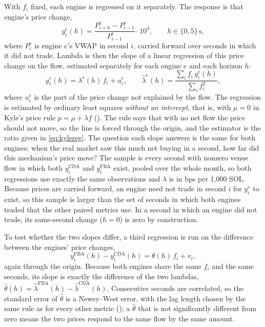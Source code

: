 With $f_i$ fixed, each engine is regressed on it separately. The response
is that engine's price change,
\begin{equation}
  \label{eq:kyley}
  y^{e}_i(h) = \frac{P^{e}_{i+h} - P^{e}_{i-1}}{P^{e}_{i-1}} \cdot 10^{4},
  \qquad h \in \{0, 5\}\,\text{s},
\end{equation}
where $P^{e}_i$ is engine $e$'s VWAP in second $i$, carried forward over
seconds in which it did not trade. Lambda is then the slope of a linear
regression of this price change on the flow, estimated separately for
each engine $e$ and each horizon $h$:
\begin{equation}
  \label{eq:kylereg}
  y^{e}_i(h) = \lambda^{e}(h)\, f_i + u^{e}_i,
  \qquad
  \hat{\lambda}^{e}(h) = \frac{\sum_i f_i\, y^{e}_i(h)}{\sum_i f_i^{2}},
\end{equation}
where $u^{e}_i$ is the part of the price change not explained by the
flow. The regression is estimated by ordinary least squares
\emph{without an intercept}, that is, with $\mu = 0$ in Kyle's price rule
$p = \mu + \lambda f$ (). The rule says that with no
net flow the price should not move, so the line is forced through the
origin, and the
estimator is the ratio given in \eqref{eq:kylereg}. The question each
slope answers is the same for both engines: when the real market saw
this much net buying in a second, how far did this mechanism's price
move? The sample is every second with nonzero venue flow in which both
$y^{\mathrm{CDA}}_i$ and $y^{\mathrm{FBA}}_i$ exist, pooled over the
whole month, so both regressions use exactly the same observations and
$\lambda$ is in bps per 1{,}000 SOL. Because prices are carried forward,
an engine need not trade in second $i$ for $y^{e}_i$ to exist, so this
sample is larger than the set of seconds in which both engines traded
that the other paired metrics use. In a second in which an engine did
not trade, its same-second change ($h = 0$) is zero by construction.

To test whether the two slopes differ, a third regression is run on the
difference between the engines' price changes,
\begin{equation}
  \label{eq:kylediff}
  y^{\mathrm{FBA}}_i(h) - y^{\mathrm{CDA}}_i(h) = \theta(h)\, f_i + v_i ,
\end{equation}
again through the origin. Because both engines share the same $f_i$ and
the same seconds, its slope is exactly the difference of the two
lambdas, $\hat{\theta}(h) = \hat{\lambda}^{\mathrm{FBA}}(h) -
\hat{\lambda}^{\mathrm{CDA}}(h)$. Consecutive seconds are correlated, so
the standard error of $\hat{\theta}$ is a Newey--West error, with the
lag length chosen by the same rule as for every other metric
(); a $\hat{\theta}$ that is not significantly
different from zero means the two prices respond to the same flow by the
same amount.

